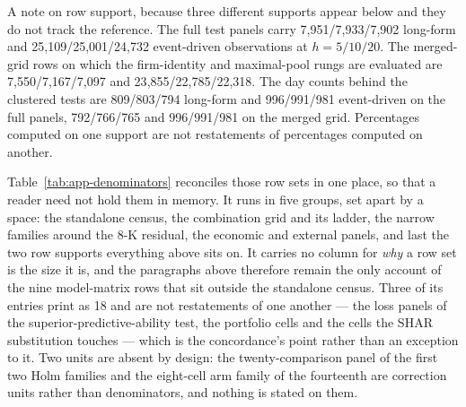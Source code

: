 A note on row support, because three different supports appear below and
they do not track the reference. The full test panels carry
7{,}951/7{,}933/7{,}902 long-form and 25{,}109/25{,}001/24{,}732
event-driven observations at $h = 5/10/20$. %
The merged-grid rows on which the firm-identity and maximal-pool rungs
are evaluated are 7{,}550/7{,}167/7{,}097 and
23{,}855/22{,}785/22{,}318. %
The day counts behind the clustered tests are 809/803/794 long-form
and 996/991/981 event-driven on the full panels, 792/766/765 and
996/991/981 on the merged grid. %
Percentages computed on one support are not restatements of percentages
computed on another.

Table~\ref{tab:app-denominators} reconciles those row sets in one place, so
that a reader need not hold them in memory. It runs in five groups, set apart by a space:
the standalone census, the combination grid and its ladder, the narrow families
around the 8-K residual, the economic and external panels, and last the two row
supports everything above sits on. It carries no column for \emph{why}
a row set is the size it is, and the paragraphs above therefore remain the only
account of the nine model-matrix rows that sit outside the standalone census.
Three of its entries print as 18 and are not restatements of one another --- the
loss panels of the superior-predictive-ability test, the portfolio cells and the
cells the SHAR substitution touches --- which is the concordance's point rather
than an exception to it. Two units are absent by design: the twenty-comparison
panel of the first two Holm families and the eight-cell arm family of the
fourteenth are correction units rather than denominators, and nothing is stated
on them.

